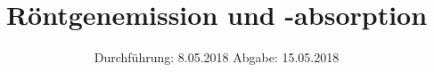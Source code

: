
\usepackage{longtable}
\usepackage{wrapfig}
\usepackage{ dsfont }
\subject{VERSUCH 602}
\title{Röntgenemission und -absorption}
\date{%
  \hspace{-2.5em}
  Durchführung: 8.05.2018
  \hspace{4em}
  Abgabe: 15.05.2018
}


  \setlength{\parindent}{0em}
  \maketitle
  \thispagestyle{empty}
  \newpage
  \tableofcontents
  \newpage





\printbibliography{}
% 


